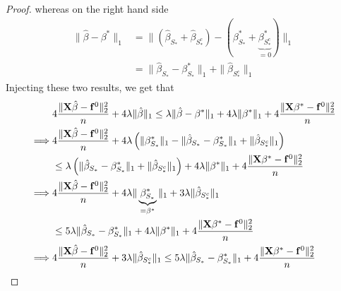 \begin{proof}
    whereas on the right hand side
    \begin{align*}
        \|\hat{\beta}-\beta^{*} \|_{1}
         & =  \| (\hat{\beta}_{S_{*}} + \hat{\beta}_{S_{*}^{c}}) - (\beta_{S_{*}}^{*} + \underbrace{\beta_{S_{*}^{c}}^*}_{=0}) \|_{1} \\
         & =  \| \hat{\beta}_{S_{*}}-\beta_{S_{*}}^{*} \|_{1} + \|\hat{\beta}_{S_{*}^{c}} \|_{1}
    \end{align*}
    Injecting these two results, we get that
    \begin{align*}
                 & 4 \frac{\| \mathbf{X} \hat \beta - \mathbf{f}^0 \|_{2}^{2}}{n} + 4 \lambda\| \hat \beta \|_{1} \leq \lambda \| \hat\beta - \beta^* \|_{1} + 4 \lambda \| \beta^*\|_{1} + 4\frac{\|\mathbf{X} \beta^* - \mathbf{f}^0\|_{2}^{2}}{n} \\
        \implies &
        4 \frac{\| \mathbf{X} \hat \beta - \mathbf{f}^0 \|_{2}^{2}}{n} + 4 \lambda \left( \|\beta_{S_{*}}^{*} \|_{1} - \|\hat{\beta}_{S_{*}}-\beta_{S_{*}}^{*} \|_{1}+ \|\hat{\beta}_{S_{*}^{c}} \|_{1} \right)                              \\
                 & \leq \lambda \left( \| \hat{\beta}_{S_{*}}-\beta_{S_{*}}^{*} \|_{1} + \|\hat{\beta}_{S_{*}^{c}} \|_{1} \right) + 4 \lambda \| \beta^*\|_{1} + 4\frac{\|\mathbf{X} \beta^* - \mathbf{f}^0\|_{2}^{2}}{n}                    \\
        \implies &
        4 \frac{\| \mathbf{X} \hat \beta - \mathbf{f}^0 \|_{2}^{2}}{n} + 4 \lambda \| \underbrace{\beta_{S_{*}}^{*}}_{= \beta^{*}} \|_{1} + 3 \lambda\|\hat{\beta}_{S_{*}^{c}} \|_{1}                                                        \\
                 & \leq 5 \lambda \| \hat{\beta}_{S_{*}}-\beta_{S_{*}}^{*} \|_{1} + 4 \lambda \| \beta^*\|_{1} + 4\frac{\|\mathbf{X} \beta^* - \mathbf{f}^0\|_{2}^{2}}{n}                                                                    \\
        \implies &
        4 \frac{\| \mathbf{X} \hat \beta - \mathbf{f}^0 \|_{2}^{2}}{n} + 3 \lambda\|\hat{\beta}_{S_{*}^{c}} \|_{1} \leq 5 \lambda \| \hat{\beta}_{S_{*}}-\beta_{S_{*}}^{*} \|_{1} + 4\frac{\|\mathbf{X} \beta^* - \mathbf{f}^0\|_{2}^{2}}{n}         \\
    \end{align*}
\end{proof}


